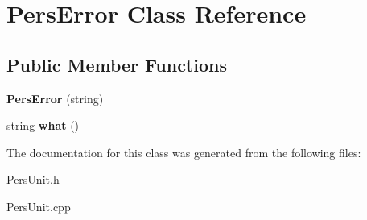 \hypertarget{classPersError}{\section{Pers\-Error Class Reference}
\label{da/dcf/classPersError}
}
\subsection*{Public Member Functions}
\begin{DoxyCompactItemize}
\item 
\hypertarget{classPersError_a6c7a979c6ac884b820657e54331d68a6}{{\bfseries Pers\-Error} (string)}\label{da/dcf/classPersError_a6c7a979c6ac884b820657e54331d68a6}

\item 
\hypertarget{classPersError_a92a1000d4105875297edcefb5a78b77c}{string {\bfseries what} ()}\label{da/dcf/classPersError_a92a1000d4105875297edcefb5a78b77c}

\end{DoxyCompactItemize}


The documentation for this class was generated from the following files\-:\begin{DoxyCompactItemize}
\item 
Pers\-Unit.\-h\item 
Pers\-Unit.\-cpp\end{DoxyCompactItemize}

